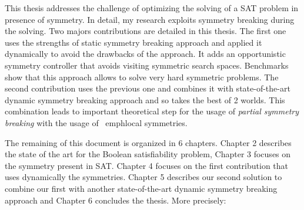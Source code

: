 %
%
%

This thesis addresses the challenge of optimizing the solving of a SAT problem in presence of
symmetry. In detail, my research exploits symmetry breaking during the solving.
Two majors contributions are detailed in this thesis. The first one uses the strengths of static symmetry 
breaking approach and applied it dynamically to avoid the drawbacks of the approach. It adds an opportunistic symmetry controller that avoids visiting symmetric search spaces. Benchmarks show that this approach allows to solve very hard symmetric problems.
The second contribution uses the previous one and combines it with state-of-the-art dynamic 
symmetry breaking approach and so takes the best of 2 worlds. This combination leads to 
important theoretical step for the usage of \emph{partial symmetry breaking} with the usage of 
\ emph{local symmetries}. 
 


The remaining of this document is organized in 6 chapters. Chapter 2 describes the state of
the art for the Boolean satisfiability problem, Chapter 3 focuses on the symmetry present in SAT.
Chapter 4 focuses on the first contribution that uses dynamically the symmetries.
Chapter 5 describes our second solution to combine our first with another state-of-the-art  
dynamic symmetry breaking approach and Chapter 6 concludes the thesis. More precisely:
 
